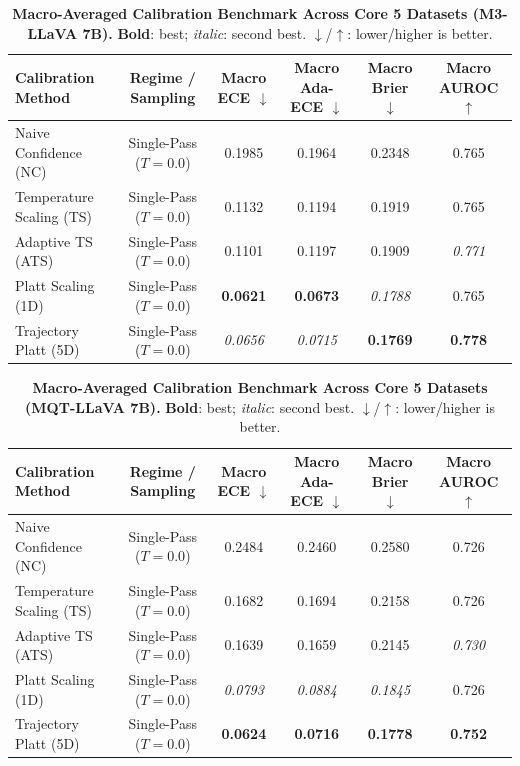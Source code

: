\begin{table}[t]
\setlength{\tabcolsep}{4pt}
\renewcommand{\arraystretch}{1.05}
\centering
\footnotesize
\begin{tabular}{lccccc}
\toprule
\textbf{Calibration Method} & \textbf{Regime / Sampling} & \textbf{Macro ECE} $\downarrow$ & \textbf{Macro Ada-ECE} $\downarrow$ & \textbf{Macro Brier} $\downarrow$ & \textbf{Macro AUROC} $\uparrow$ \\
\midrule
Naive Confidence (NC) & Single-Pass ($T = 0.0$) & 0.1985 & 0.1964 & 0.2348 & 0.765 \\
Temperature Scaling (TS) & Single-Pass ($T = 0.0$) & 0.1132 & 0.1194 & 0.1919 & 0.765 \\
Adaptive TS (ATS) & Single-Pass ($T = 0.0$) & 0.1101 & 0.1197 & 0.1909 & \textit{0.771} \\
Platt Scaling (1D) & Single-Pass ($T = 0.0$) & \textbf{0.0621} & \textbf{0.0673} & \textit{0.1788} & 0.765 \\
Trajectory Platt (5D) & Single-Pass ($T = 0.0$) & \textit{0.0656} & \textit{0.0715} & \textbf{0.1769} & \textbf{0.778} \\
\bottomrule
\end{tabular}
\caption{\textbf{Macro-Averaged Calibration Benchmark Across Core 5 Datasets (M3-LLaVA 7B).} \textbf{Bold}: best; \textit{italic}: second best. $\downarrow$/$\uparrow$: lower/higher is better.}
\label{tab:benchmark_macro_macro_m3}
\end{table}

\begin{table}[t]
\setlength{\tabcolsep}{4pt}
\renewcommand{\arraystretch}{1.05}
\centering
\footnotesize
\begin{tabular}{lccccc}
\toprule
\textbf{Calibration Method} & \textbf{Regime / Sampling} & \textbf{Macro ECE} $\downarrow$ & \textbf{Macro Ada-ECE} $\downarrow$ & \textbf{Macro Brier} $\downarrow$ & \textbf{Macro AUROC} $\uparrow$ \\
\midrule
Naive Confidence (NC) & Single-Pass ($T = 0.0$) & 0.2484 & 0.2460 & 0.2580 & 0.726 \\
Temperature Scaling (TS) & Single-Pass ($T = 0.0$) & 0.1682 & 0.1694 & 0.2158 & 0.726 \\
Adaptive TS (ATS) & Single-Pass ($T = 0.0$) & 0.1639 & 0.1659 & 0.2145 & \textit{0.730} \\
Platt Scaling (1D) & Single-Pass ($T = 0.0$) & \textit{0.0793} & \textit{0.0884} & \textit{0.1845} & 0.726 \\
Trajectory Platt (5D) & Single-Pass ($T = 0.0$) & \textbf{0.0624} & \textbf{0.0716} & \textbf{0.1778} & \textbf{0.752} \\
\bottomrule
\end{tabular}
\caption{\textbf{Macro-Averaged Calibration Benchmark Across Core 5 Datasets (MQT-LLaVA 7B).} \textbf{Bold}: best; \textit{italic}: second best. $\downarrow$/$\uparrow$: lower/higher is better.}
\label{tab:benchmark_macro_macro_mqt}
\end{table}
